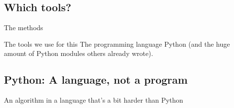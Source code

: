 \documentclass[handout]{beamer}
\begin{document}
\subsection{Which tools?}


\begin{frame}{The methods}
	\begin{block}{The tools we use for this}
		The programming language Python (and the huge amount of Python modules others already wrote).
	\end{block}
\end{frame}





\subsection{Python: A language, not a program}


\begin{frame}[plain]
	\footnotesize{An algorithm in a language that's a bit harder than Python}
\end{frame}
\end{document}
